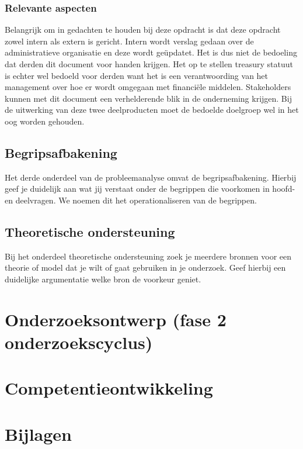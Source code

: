 \documentclass[10pt,a4paper,twoside]{report}
\begin{document}
\subsection{Relevante aspecten}
Belangrijk om in gedachten te houden bij deze opdracht is dat deze opdracht zowel intern als extern is gericht. Intern wordt verslag gedaan over de administratieve organisatie en deze wordt geüpdatet. Het is dus niet de bedoeling dat derden dit document voor handen krijgen. Het op te stellen treasury statuut is echter wel bedoeld voor derden want het is een verantwoording van het management over hoe er wordt omgegaan met financiële middelen. Stakeholders kunnen met dit document een verhelderende blik in de onderneming krijgen. Bij de uitwerking van deze twee deelproducten moet de bedoelde doelgroep wel in het oog worden gehouden.

\section{Begripsafbakening}
Het derde onderdeel van de probleemanalyse omvat de begripsafbakening. Hierbij geef je duidelijk aan wat jij verstaat onder de begrippen die voorkomen in hoofd- en deelvragen. We noemen dit het operationaliseren van de begrippen.

\section{Theoretische ondersteuning}
Bij het onderdeel theoretische ondersteuning zoek je meerdere bronnen voor een theorie of model dat je wilt of gaat gebruiken in je onderzoek. Geef hierbij een duidelijke argumentatie welke bron de voorkeur geniet.

\chapter{Onderzoeksontwerp (fase 2 onderzoekscyclus)}

\chapter{Competentieontwikkeling}

\printbibliography
{}

\chapter*{Bijlagen}
\end{document}
